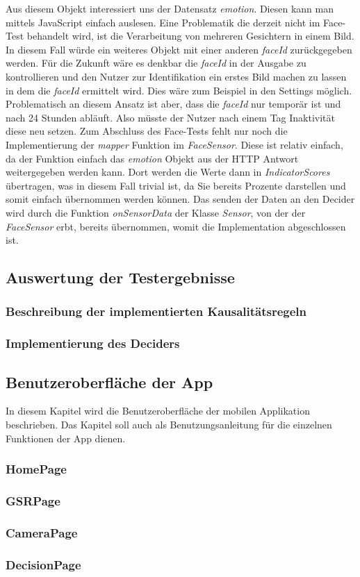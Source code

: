 Aus diesem Objekt interessiert uns der Datensatz \textit{emotion}. Diesen kann man mittels JavaScript einfach auslesen. Eine Problematik die derzeit nicht im Face-Test behandelt wird, ist die Verarbeitung von mehreren Gesichtern in einem Bild. In diesem Fall würde ein weiteres Objekt mit einer anderen \textit{faceId} zurückgegeben werden. Für die Zukunft wäre es denkbar die \textit{faceId} in der Ausgabe zu kontrollieren und den Nutzer zur Identifikation ein erstes Bild machen zu lassen in dem die \textit{faceId} ermittelt wird. Dies wäre zum Beispiel in den Settings möglich. Problematisch an diesem Ansatz ist aber, dass die \textit{faceId} nur temporär ist und nach 24 Stunden abläuft. Also müsste der Nutzer nach einem Tag Inaktivität diese neu setzen.\newline
Zum Abschluss des Face-Tests fehlt nur noch die Implementierung der \textit{mapper} Funktion im \textit{FaceSensor}. Diese ist relativ einfach, da der Funktion einfach das \textit{emotion} Objekt aus der HTTP Antwort weitergegeben werden kann. Dort werden die Werte dann in \textit{IndicatorScores} übertragen, was in diesem Fall trivial ist, da Sie bereits Prozente darstellen und somit einfach übernommen werden können. Das senden der Daten an den Decider wird durch die Funktion \textit{onSensorData} der Klasse \textit{Sensor}, von der der \textit{FaceSensor} erbt, bereits übernommen, womit die Implementation abgeschlossen ist.   
\subsection{Auswertung der Testergebnisse}
\subsubsection{Beschreibung der implementierten Kausalitätsregeln}
\subsubsection{Implementierung des Deciders}
\subsection{Benutzeroberfläche der App}
In diesem Kapitel wird die Benutzeroberfläche der mobilen Applikation beschrieben. Das Kapitel soll auch als Benutzungsanleitung für die einzelnen Funktionen der App dienen.
\subsubsection{HomePage}
\subsubsection{GSRPage}
\subsubsection{CameraPage}
\subsubsection{DecisionPage}
